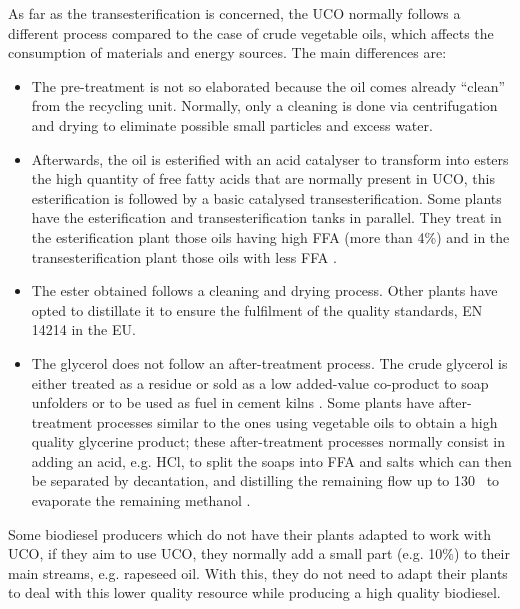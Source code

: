 \documentclass[sustainability,article,submit,moreauthors,pdftex,12pt,a4paper]{mdpi}
\newcommand{\degreeC}[1]{#1~\textcelsius}
\begin{document}
As far as the transesterification is concerned, the UCO normally follows a different process compared to the case of crude vegetable oils, which affects the consumption of materials and energy sources. The main differences are:
\begin{itemize}
\item The pre-treatment is not so elaborated because the oil comes already ``clean'' from the recycling unit. Normally, only a cleaning is done via centrifugation and drying to eliminate possible small particles and excess water.
\item Afterwards, the oil is esterified with an acid catalyser to transform into esters the high quantity of free fatty acids that are normally present in UCO, this esterification is followed by a basic catalysed transesterification. Some plants have the esterification and transesterification tanks in parallel. They treat in the esterification plant those oils having high FFA (more than 4\%) and in the transesterification plant those oils with less FFA \cite{CIEMAT2005}.
\item The ester obtained follows a cleaning and drying process. Other plants have opted to distillate it to ensure the fulfilment of the quality standards, EN 14214 \cite{CENEN14214} in the EU.
\item The glycerol does not follow an after-treatment process. The crude glycerol is either treated as a residue or sold as a low added-value co-product to soap unfolders or to be used as fuel in cement kilns \cite{FontdeMoraThesis2013}. Some plants have after-treatment processes similar to the ones using vegetable oils to obtain a high quality glycerine product; these after-treatment processes normally consist in adding an acid, e.g. HCl, to split the soaps into FFA and salts which can then be separated by decantation, and distilling the remaining flow up to \degreeC{130} to evaporate the remaining methanol \cite{FontdeMoraThesis2013}.
\end{itemize}

Some biodiesel producers which do not have their plants adapted to work with UCO, if they aim to use UCO, they normally add a small part (e.g. 10\%) to their main streams, e.g. rapeseed oil. With this, they do not need to adapt their plants to deal with this lower quality resource while producing a high quality biodiesel.
\end{document}
